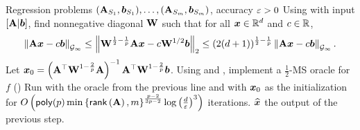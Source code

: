 \begin{algorithm}[H]
\caption{\textsf{GpRegression}: Optimizes \eqref{eq:interpolation} up to $(1+\eps)$-multiplicative error}
\label{alg:gp_regression_alg}
\begin{algorithmic}[1]
\Require Regression problems $(\mathbf{A}_{S_1},\bm{b}_{S_1}),\dots,(\mathbf{A}_{S_m},\bm{b}_{S_m})$, accuracy $\varepsilon > 0$
\State Using \cite[Algorithm 2]{mo23} with input $\left[\mathbf{A} \vert \bm{b}\right]$, find nonnegative diagonal $\mathbf{W}$ such that for all $\bm{x}\in\mathbb{R}^{d}$ and $c \in \mathbb{R}$,
\begin{align*}
    \left\lVert \mathbf{A}\bm{x}-c\bm{b} \right\rVert_{\mathcal{G}_{\infty}} \le \left\lVert \mathbf{W}^{\frac{1}{2}-\frac{1}{p}}\mathbf{A}\bm{x}-c\mathbf{W}^{1/2}\bm{b} \right\rVert_2 \le (2(d+1))^{\frac{1}{2}-\frac{1}{p}}\left\lVert \mathbf{A}\bm{x}-c\bm{b} \right\rVert_{\mathcal{G}_{\infty}}.
\end{align*}
\State Let $\bm{x}_0 = \left(\mathbf{A}^{\top}\mathbf{W}^{1-\frac{2}{p}}\mathbf{A}\right)^{-1}\mathbf{A}^{\top}\mathbf{W}^{1-\frac{2}{p}}\bm{b}$. 
\State Using  and , implement a $\frac{1}{2}$-MS oracle for $f$ ()
\State Run  with the oracle from the previous line and with $\bm{x}_0$ as the initialization for $O\left(\mathsf{poly}(p)\min\left\{\mathsf{rank}\left(\mathbf{A}\right),m\right\}^{\frac{p-2}{3p-2}}\log\left(\frac{d}{\varepsilon}\right)^3\right)$ iterations.
\State \Return $\widehat{\bm{x}}$ the output of the previous step.
\end{algorithmic}
\end{algorithm}

